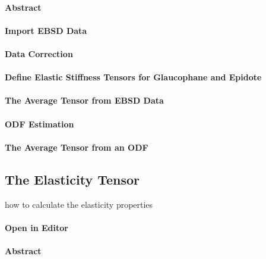 \documentclass{article}
\begin{document}
			\paragraph{Abstract}
		
			\paragraph{Import EBSD Data}
		
			\paragraph{Data Correction}
		
			\paragraph{Define Elastic Stiffness Tensors for Glaucophane and Epidote}
		
			\paragraph{The Average Tensor from EBSD Data}
		
			\paragraph{ODF Estimation}
		
			\paragraph{The Average Tensor from an ODF}
		
		\subsection{The Elasticity Tensor}

		
                     \begin{par}
how to calculate the elasticity properties
\end{par} \vspace{1em}

                  
			\paragraph{Open in Editor}
		
			\paragraph{Abstract}
		
\end{document}
